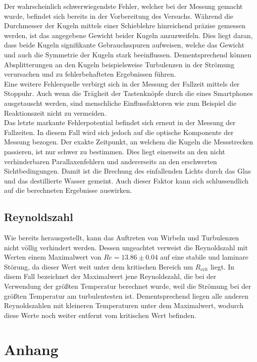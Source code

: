 Der wahrscheinlich schwerwiegendste Fehler, welcher bei der Messung gemacht wurde, befindet sich bereits in der Vorbereitung des 
Versuchs. Während die Durchmesser der Kugeln mittels einer Schieblehre hinreichend präzise gemessen werden, ist das angegebene 
Gewicht beider Kugeln anzuzweifeln. Dies liegt daran, dass beide Kugeln signifikante Gebrauchsspuren aufweisen, welche das Gewicht 
und auch die Symmetrie der Kugeln stark beeinflussen. Dementsprechend können Absplitterungen an den Kugeln beispielsweise Turbulenzen
in der Strömung verursachen und zu fehlerbehafteten Ergebnissen führen.\\
Eine weitere Fehlerquelle verbirgt sich in der Messung der Fallzeit mittels der Stoppuhr. Auch wenn die Trägheit der Tastenknöpfe durch 
die eines Smartphones ausgetauscht werden, sind menschliche Einflussfaktoren wie zum Beispiel die Reaktionszeit nicht zu vermeiden.\\
Das letzte markante Fehlerpotential befindet sich erneut in der Messung der Fallzeiten. In diesem Fall wird sich jedoch auf die 
optische Komponente der Messung bezogen. Der exakte Zeitpunkt, an welchem die Kugeln die Messstrecken passieren, ist nur schwer zu 
bestimmen. Dies liegt einerseits an den nicht verhinderbaren Parallaxenfehlern und andererseits an den erschwerten Sichtbedingungen.
Damit ist die Brechung des einfallenden Lichts durch das Glas und das destillierte Wasser gemeint. Auch dieser Faktor kann sich 
schlussendlich auf die berechneten Ergebnisse auswirken.

\subsection{Reynoldszahl}

Wie bereits herausgestellt, kann das Auftreten von Wirbeln und Turbulenzen nicht völlig verhindert werden. Dessen ungeachtet 
verweist die Reynoldszahl mit Werten einem Maximalwert von $Re = 13.86 \pm 0.04$ auf eine stabile und laminare Störung, da dieser Wert weit unter dem kritischen 
Bereich um $R_\text{crit}$ liegt. In disem Fall bezeichnet der Maximalwert jene Reynoldszahl, die bei der Verwendung der größten 
Temperatur berechnet wurde, weil die Strömung bei der größten Temperatur am turbulentesten ist. Dementsprechend liegen alle anderen 
Reynoldszahlen mit kleineren Temperaturen unter dem Maximalwert, wodurch diese Werte noch weiter entfernt vom kritischen Wert befinden.

\section{Anhang}

